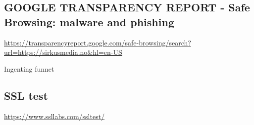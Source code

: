 \subsection{GOOGLE TRANSPARENCY REPORT - Safe Browsing: malware and phishing}
\url{https://transparencyreport.google.com/safe-browsing/search?url=https://sirkusmedia.no&hl=en-US}

Ingenting funnet

\subsection{SSL test}

\url{https://www.ssllabs.com/ssltest/}


\clearpage